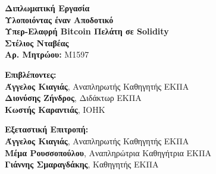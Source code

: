 \begin{center}
    \vspace{3cm}
    \large \textbf{Διπλωματική Εργασία}\\
    \vspace{3cm}
    \textbf{Υλοποιόντας έναν Αποδοτικό\\
    Υπερ-Ελαφρή Bitcoin Πελάτη σε Solidity}\\
    \vspace{3cm}
    \large \textbf{Στέλιος Νταβέας}\\
    \textbf{Αρ. Μητρώου:} M1597
    \vspace{5cm}
    \begin{flushleft}
        \textbf{Επιβλέποντες:}\\
        \hspace{2cm}
        \textbf{Άγγελος Κιαγιάς}, Αναπληρωτής Καθηγητής ΕΚΠΑ\\
        \hspace{2cm}
        \textbf{Διονύσης Ζήνδρος}, Διδάκτωρ ΕΚΠΑ\\
        \hspace{2cm}
        \textbf{Κωστής Καραντιάς}, IOHK



        \vspace{1cm}

        \textbf{Εξεταστική Επιτροπή:}\\
        \hspace{2cm}
        \textbf{Άγγελος Κιαγιάς}, Αναπληρωτής Καθηγητής ΕΚΠΑ\\
        \hspace{2cm}
        \textbf{Μέμα Ρουσσοπούλου}, Αναπληρώτρια Καθηγήτρια ΕΚΠΑ\\
        \hspace{2cm}
        \textbf{Γιάννης Σμαραγδάκης}, Καθηγητής ΕΚΠΑ

    \end{flushleft}
\end{center}

\pagebreak
